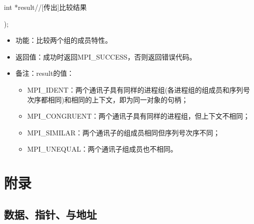 \documentclass[UTF8]{article}%
\begin{document}
    \qquad int        *result//[传出]比较结果

);

\begin{itemize}
    \item 功能：比较两个组的成员特性。
    \item 返回值：成功时返回MPI\_SUCCESS，否则返回错误代码。
    \item 备注：result的值：
    
    {
        \begin{itemize}
            \item MPI\_IDENT：两个通讯子具有同样的进程组(各进程组的组成员和序列号次序都相同)和相同的上下文，即为同一对象的句柄；
            \item MPI\_CONGRUENT：两个通讯子具有同样的进程组，但上下文不相同；
            \item MPI\_SIMILAR：两个通讯子的组成员相同但序列号次序不同；
            \item MPI\_UNEQUAL：两个通讯子组成员也不相同。
        \end{itemize}
    }

\end{itemize}

\section{附录}

\subsection{数据、指针、与地址}
\end{document}
